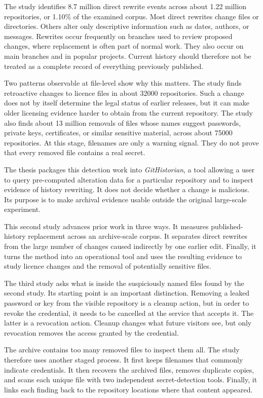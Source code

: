 \begin{SingleSpace}
The study identifies \num{8.7} million direct rewrite events across about \num{1.22} million repositories, or \num{1.10}\% of the examined corpus.
Most direct rewrites change files or directories.
Others alter only descriptive information such as dates, authors, or messages.
Rewrites occur frequently on branches used to review proposed changes, where replacement is often part of normal work.
They also occur on main branches and in popular projects.
Current history should therefore not be treated as a complete record of everything previously published.

Two patterns observable at file-level show why this matters.
The study finds retroactive changes to licence files in about \num{32000} repositories.
Such a change does not by itself determine the legal status of earlier releases, but it can make older licensing evidence harder to obtain from the current repository.
The study also finds about \num{13} million removals of files whose names suggest passwords, private keys, certificates, or similar sensitive material, across about \num{75000} repositories.
At this stage, filenames are only a warning signal.
They do not prove that every removed file contains a real secret.

The thesis packages this detection work into \textit{GitHistorian}, a tool allowing a user to query pre-computed alteration data for a particular repository and to inspect evidence of history rewriting.
It does not decide whether a change is malicious.
Its purpose is to make archival evidence usable outside the original large-scale experiment.

This second study advances prior work in three ways.
It measures published-history replacement across an archive-scale corpus.
It separates direct rewrites from the large number of changes caused indirectly by one earlier edit.
Finally, it turns the method into an operational tool and uses the resulting evidence to study licence changes and the removal of potentially sensitive files.

The third study asks what is inside the suspiciously named files found by the second study.
Its starting point is an important distinction.
Removing a leaked password or key from the visible repository is a cleanup action, but in order to revoke the credential, it needs to be cancelled at the service that accepts it.
The latter is a revocation action.
Cleanup changes what future visitors see, but only revocation removes the access granted by the credential.

The archive contains too many removed files to inspect them all.
The study therefore uses another staged process.
It first keeps filenames that commonly indicate credentials.
It then recovers the archived files, removes duplicate copies, and scans each unique file with two independent secret-detection tools.
Finally, it links each finding back to the repository locations where that content appeared.


\end{SingleSpace}
